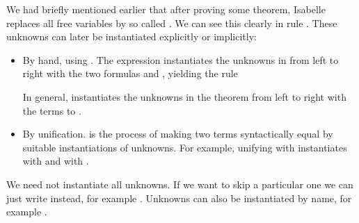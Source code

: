 \begin{isabellebody}
\begin{isamarkuptext}
We had briefly mentioned earlier that after proving some theorem,
Isabelle replaces all free variables  by so called 
. We can see this clearly in rule .
These unknowns can later be instantiated explicitly or implicitly:
\begin{itemize}
\item By hand, using .
The expression 
instantiates the unknowns in  from left to right with the
two formulas  and , yielding the rule
\begin{isabelle}%
\mbox{}%
\end{isabelle}

In general,  instantiates
the unknowns in the theorem  from left to right with the terms
 to .

\item By unification.  is the process of making two
terms syntactically equal by suitable instantiations of unknowns. For example,
unifying  with \mbox{} instantiates
 with  and  with .
\end{itemize}
We need not instantiate all unknowns. If we want to skip a particular one we
can just write  instead, for example .
Unknowns can also be instantiated by name, for example
.



\end{isamarkuptext}
\end{isabellebody}
